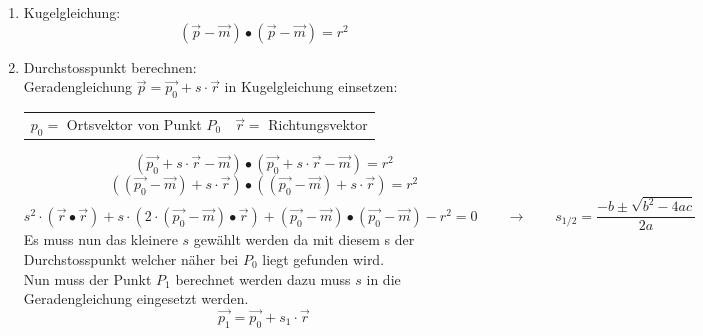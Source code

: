 	\begin{enumerate}
		\item Kugelgleichung:
			\begin{equation*}
				(\vec{p} - \vec{m})\bullet (\vec{p} - \vec{m}) = r^2
			\end{equation*}
		\item Durchstosspunkt berechnen:\\
			Geradengleichung $\vec{p} = \vec{p_0} + s \cdot \vec{r}$ in Kugelgleichung einsetzen:\\
			\begin{tabular}{ll}
				$p_0 = $ Ortsvektor von Punkt $P_0$ & $\vec{r} = $ Richtungsvektor 
			\end{tabular}
			\begin{equation*}
			(\vec{p_0} + s \cdot \vec{r} - \vec{m})\bullet (\vec{p_0} + s \cdot \vec{r} - \vec{m}) = r^2
			\end{equation*}
			\begin{equation*}
			((\vec{p_0}-\vec{m}) + s \cdot \vec{r}) 
			\bullet
			((\vec{p_0}-\vec{m}) + s \cdot \vec{r}) = r^2
			\end{equation*}
			\begin{equation*}
			s^2 \cdot (\vec{r} \bullet \vec{r}) +
			s\cdot(2 \cdot (\vec{p_0}-\vec{m}) \bullet \vec{r}) +
			(\vec{p_0}-\vec{m}) \bullet (\vec{p_0}-\vec{m})
			-r^2 = 0
			\qquad \rightarrow \qquad
			s_{1/2} = \displaystyle \frac{-b \pm \sqrt{b^2-4ac}}{2a}
			\end{equation*}
			Es muss nun das kleinere  $s$ gewählt werden da mit diesem s der Durchstosspunkt welcher näher bei $P_0$ liegt gefunden wird.\\
			Nun muss der Punkt $P_1$ berechnet werden dazu muss $s$ in die Geradengleichung eingesetzt werden.
			\begin{equation*}
			\vec{p_1} = \vec{p_0} + s_1 \cdot \vec{r}
			\end{equation*}
						

\end{enumerate}

